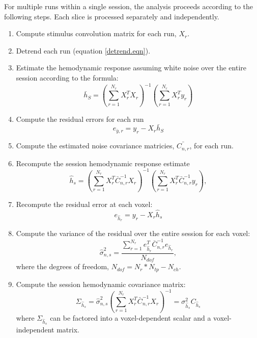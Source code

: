 \documentclass[12pt]{article}
\begin{document}
For multiple runs within a single session, the analysis proceeds 
according to the following steps.  Each slice is processed separately
and independently.
\begin{enumerate}
\item Compute stimulus convolution matrix for each run, $X_r$.
\item Detrend each run (equation \ref{detrend.eqn}).
\item Estimate the hemodynamic response assuming white noise
over the entire session according to the formula: 
\begin{equation}
\bar{h}_S = \left(\sum_{r=1}^{N_r} {X_r^T X_r}\right)^{-1} 
\left(\sum_{r=1}^{N_r} {X_r^T y_r}\right)
\label{hsbar.eqn}
\end{equation}
\item Compute the residual errors for each run
\begin{equation}
e_{\bar{y},r} = y_r - X_r \bar{h}_S
\label{resbarrun.eqn}
\end{equation}
\item Compute the estimated noise covariance matricies, 
$\bar{C_{n,r}}$, for each run.

\item Recompute the session hemodynamic response estimate 
\begin{equation}
\hat{h}_s = \left(\sum_{r=1}^{N_r} {X_r^T \bar{C}_{n,r}^{-1} X_r}\right)^{-1} 
       \left(\sum_{r=1}^{N_r} {X_r^T \bar{C}_{n,r}^{-1} y_r} \right),
\label{hshat.eqn}
\end{equation}

\item Recompute the residual error at each voxel:
\begin{equation}
e_{\hat{h}_r} = y_r - X_r \hat{h}_s
\end{equation}

\item Compute the variance of the residual over the entire session for
each voxel:
\begin{equation}
\hat{\sigma}_{n,s}^2 = \frac{\sum_{r=1}^{N_r} 
    e_{\hat{h}_r}^T \bar{C}_{n,r}^{-1} e_{\hat{h}_r}}{N_{dof}},
\end{equation}
where the degrees of freedom, $N_{dof} = N_r * N_{tp} - N_{ch}$.

\item Compute the session hemodynamic covariance matrix:
\begin{equation}
\Sigma_{\hat{h}_s} = \hat{\sigma}_{n,s}^2 
  \left(\sum_{r=1}^{N_r} {X_r^T  \bar{C}_{n,r}^{-1} X_r}\right)^{-1} =
 \sigma^2_{\hat{h}_s} C_{\hat{h}_s} 
\end{equation}
where $\Sigma_{\hat{h}_s}$ can be factored into a voxel-dependent
scalar and a voxel-independent matrix.

\end{enumerate}
\end{document}
